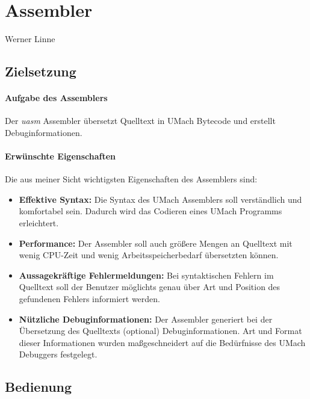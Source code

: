 \section{Assembler}
\begin{flushright}
Werner Linne
\end{flushright}

\subsection{Zielsetzung}

\paragraph{Aufgabe des Assemblers}

Der \emph{uasm} Assembler übersetzt Quelltext in UMach Bytecode und erstellt
Debuginformationen.

\paragraph{Erwünschte Eigenschaften}

Die aus meiner Sicht wichtigsten Eigenschaften des Assemblers sind:
\begin{itemize}
\item \textbf{Effektive Syntax:} Die Syntax des UMach Assemblers soll verständlich
und komfortabel sein. Dadurch wird das Codieren eines UMach Programms erleichtert.

\item \textbf{Performance:} Der Assembler soll auch größere Mengen an Quelltext
mit wenig CPU-Zeit und wenig Arbeitsspeicherbedarf übersetzten können.

\item \textbf{Aussagekräftige Fehlermeldungen:} Bei syntaktischen Fehlern im
Quelltext soll der Benutzer möglichts genau über Art und Position des gefundenen
Fehlers informiert werden.

\item \textbf{Nützliche Debuginformationen:} Der Assembler generiert bei der
Übersetzung des Quelltexts (optional) Debuginformationen. Art und Format dieser
Informationen wurden maßgeschneidert auf die Bedürfnisse des UMach Debuggers
festgelegt.
\end{itemize}

\subsection{Bedienung}

